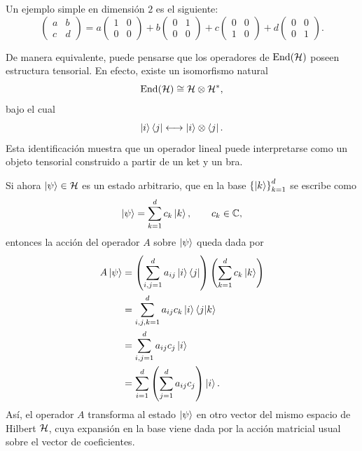 \documentclass[../main.tex]{subfiles}
\begin{document}
Un ejemplo simple en dimensión $2$ es el siguiente:
\begin{equation*}
    \begin{pmatrix}
        a & b\\
        c & d
    \end{pmatrix}
    =
    a
    \begin{pmatrix}
        1 & 0\\
        0 & 0
    \end{pmatrix}
    +
    b
    \begin{pmatrix}
        0 & 1\\
        0 & 0
    \end{pmatrix}
    +
    c
    \begin{pmatrix}
        0 & 0\\
        1 & 0
    \end{pmatrix}
    +
    d
    \begin{pmatrix}
        0 & 0\\
        0 & 1
    \end{pmatrix}.
\end{equation*}

De manera equivalente, puede pensarse que los operadores de $\operatorname{End}(\mathcal{H})$ poseen estructura tensorial. En efecto, existe un isomorfismo natural
\begin{equation*}
    \operatorname{End}(\mathcal{H})\cong \mathcal{H}\otimes \mathcal{H}^{*},
\end{equation*}
bajo el cual
\begin{equation*}
    \ket{i}\bra{j}\longleftrightarrow \ket{i}\otimes \bra{j}.
\end{equation*}
Esta identificación muestra que un operador lineal puede interpretarse como un objeto tensorial construido a partir de un ket y un bra.

Si ahora $\ket{\psi}\in\mathcal{H}$ es un estado arbitrario, que en la base $\left\{\ket{k}\right\}_{k=1}^{d}$ se escribe como
\begin{equation*}
    \ket{\psi}=\sum_{k=1}^{d} c_k \ket{k},
    \qquad c_k\in\mathbb{C},
\end{equation*}
entonces la acción del operador $A$ sobre $\ket{\psi}$ queda dada por
\begin{align*}
    A\ket{\psi}
    &=
    \left(
        \sum_{i,j=1}^{d} a_{ij}\ket{i}\bra{j}
    \right)
    \left(
        \sum_{k=1}^{d} c_k\ket{k}
    \right)\\
    &=
    \sum_{i,j,k=1}^{d} a_{ij}c_k \ket{i}\braket{j|k}\\
    &=
    \sum_{i,j=1}^{d} a_{ij}c_j \ket{i}\\
    &=
    \sum_{i=1}^{d}
    \left(
        \sum_{j=1}^{d} a_{ij}c_j
    \right)\ket{i}.
\end{align*}
Así, el operador $A$ transforma al estado $\ket{\psi}$ en otro vector del mismo espacio de Hilbert $\mathcal{H}$, cuya expansión en la base viene dada por la acción matricial usual sobre el vector de coeficientes.
\end{document}
